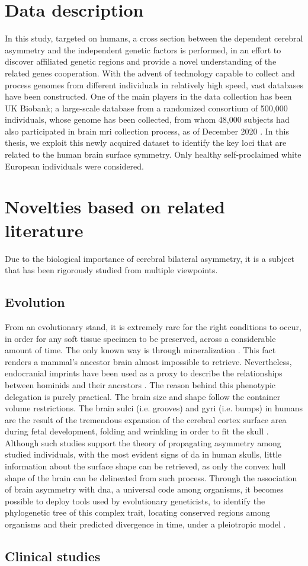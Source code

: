 \section{Data description}
In this study, targeted on humans, a cross section between the dependent cerebral asymmetry and the independent genetic factors is performed, in an effort to discover affiliated genetic regions and provide a novel understanding of the related genes cooperation. With the advent of technology capable to collect and process genomes from different individuals in relatively high speed, vast databases have been constructed. One of the main players in the data collection has been UK Biobank; a large-scale database from a randomized consortium of 500,000 individuals, whose genome has been collected, from whom  48,000 subjects had also participated in brain \ac{mri} collection process, as of December 2020 \cite{Littlejohns2020}. In this thesis, we exploit this newly acquired dataset to identify the key loci that are related to the human brain surface symmetry. Only healthy self-proclaimed white European individuals were considered. 

\section{Novelties based on related literature} 
 Due to the biological importance of cerebral bilateral asymmetry, it is a subject that has been rigorously studied from multiple viewpoints.
 \subsection{Evolution}
 From an evolutionary stand, it is extremely rare for the right conditions to occur, in order for any soft tissue specimen to be preserved, across a considerable amount of time. The only known way is through mineralization \cite{Purnell2018}. This fact renders a mammal's ancestor brain almost impossible to retrieve. Nevertheless, endocranial imprints have been used as a proxy to describe the relationships between hominids and their ancestors \cite{Balzeau2012}\cite{Neubauer2020}. The reason behind this phenotypic delegation is purely practical. The brain size and shape follow the container volume restrictions. The brain sulci (i.e. grooves) and gyri (i.e. bumps) in humans are the result of the tremendous expansion of the cerebral cortex surface area during fetal development, folding and wrinkling in order to fit the skull \cite{F.Bear2016}. Although such studies support the theory of propagating asymmetry among studied individuals, with the most evident signs of \ac{da} in human skulls, little information about the surface shape can be retrieved, as only the convex hull shape of the brain can be delineated from such process. Through the association of brain asymmetry with \acs{dna}, a universal code among organisms, it becomes possible to deploy tools used by evolutionary geneticists, to identify the phylogenetic tree of this complex trait, locating conserved regions among organisms and their predicted divergence in time, under a pleiotropic model \cite{Koch2021}.
 \subsection{Clinical studies}
 